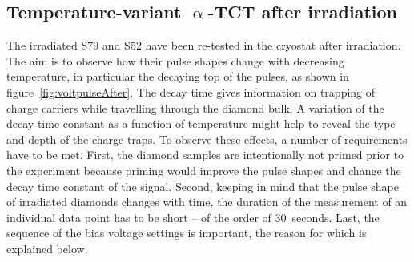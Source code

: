 \subsection{Temperature-variant $\upalpha$-TCT after irradiation}
The irradiated S79 and S52 have been re-tested in the cryostat after irradiation. The aim is to observe how their pulse shapes change with decreasing temperature, in particular the decaying top of the pulses, as shown in figure~\ref{fig:voltpulseAfter}. The decay time gives information on trapping of charge carriers while travelling through the diamond bulk. A variation of the decay time constant as a function of temperature might help to reveal the type and depth of the charge traps. To observe these effects, a number of requirements have to be met. First, the diamond samples are intentionally not primed prior to the experiment because priming would improve the pulse shapes and change the decay time constant of the signal. Second, keeping in mind that the pulse shape of irradiated diamonds changes with time, the duration of the measurement of an individual data point has to be short -- of the order of 30~seconds. Last, the sequence of the bias voltage settings is important, the reason for which is explained below.
